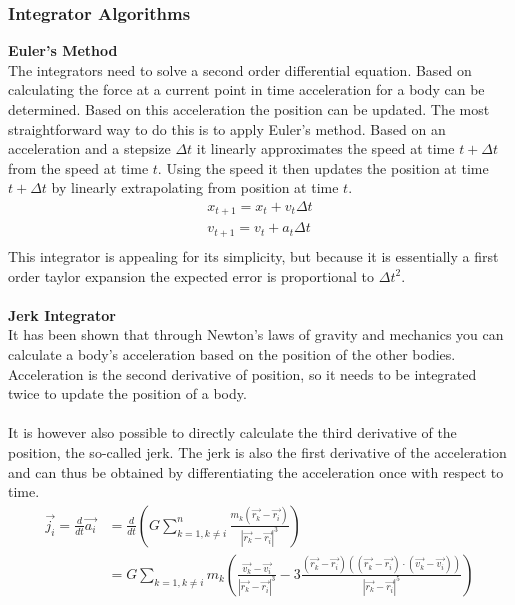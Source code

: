 \documentclass[11pt]{article} %
\begin{document}
\subsubsection{Integrator Algorithms}
\textbf{Euler's Method}\\
The integrators need to solve a second order differential equation. Based on calculating the force at a current point in time acceleration for a body can be determined. Based on this acceleration the position can be updated. The most straightforward way to do this is to apply Euler's method. Based on an acceleration and a stepsize $\Delta t$ it linearly approximates the speed at time $t + \Delta t$ from the speed at time $t$. Using the speed it then updates the position at time $t+\Delta t$ by linearly extrapolating from position at time $t$.
\begin{equation}
    \begin{split}
        x_{t+ 1} = x_t + v_t \Delta t \\
        v_{t+ 1} = v_t + a_t \Delta t \\
    \end{split}
\end{equation}
This integrator is appealing for its simplicity, but because it is essentially a first order taylor expansion the expected error is proportional to $\Delta t^2$.\\\\
\textbf{Jerk Integrator}\\
It has been shown that through Newton's laws of gravity and mechanics you can calculate a body's acceleration based on the position of the other bodies. Acceleration is the second derivative of position, so it needs to be integrated twice to update the position of a body. \\\\
It is however also possible to directly calculate the third derivative of the position, the so-called jerk. The jerk is also the first derivative of the acceleration and can thus be obtained by differentiating the acceleration once with respect to time.
\begin{align}
    \vec{j_i} = \frac{d}{dt} \vec{a_i} &= \frac{d}{dt} \left( G \sum_{k=1, k \neq i}^n \frac{m_k (\vec{r_k} - \vec{r_i})}{|\vec{r_k} - \vec{r_i}|^3} \right) \\
                                       &= G \sum_{k=1, k \neq i} m_k \left( \frac{\vec{v_k} - \vec{v_i}}{|\vec{r_k} - \vec{r_i}|^3} - 3 \frac{(\vec{r_k} - \vec{r_i})\left((\vec{r_k} - \vec{r_i})\cdot (\vec{v_k} - \vec{v_i}) \right)}{|\vec{r_k} - \vec{r_i}|^5} \right)
\end{align}
\end{document}
